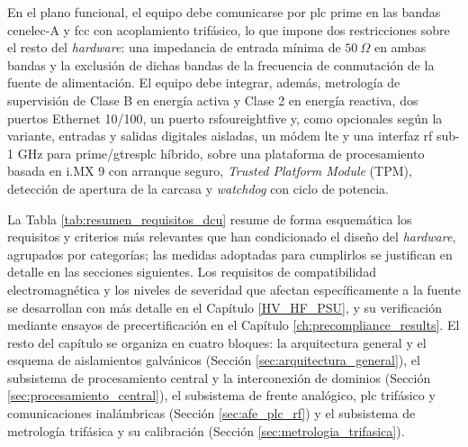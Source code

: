 En el plano funcional, el equipo debe comunicarse por \gls{plc} \gls{prime} en las bandas \gls{cenelec}-A y \gls{fcc} con acoplamiento trifásico, lo que impone dos restricciones sobre el resto del \textit{hardware}: una impedancia de entrada mínima de $50\ \Omega$ en ambas bandas y la exclusión de dichas bandas de la frecuencia de conmutación de la fuente de alimentación. El equipo debe integrar, además, metrología de supervisión de Clase B en energía activa y Clase 2 en energía reactiva, dos puertos Ethernet 10/100, un puerto \gls{rsfoureightfive} y, como opcionales según la variante, entradas y salidas digitales aisladas, un módem \gls{lte} y una interfaz \gls{rf} sub-1 GHz para \gls{prime}/\gls{gtresplc} híbrido, sobre una plataforma de procesamiento basada en i.MX 9 con arranque seguro, \textit{Trusted Platform Module} (TPM), detección de apertura de la carcasa y \textit{watchdog} con ciclo de potencia.

La Tabla \ref{tab:resumen_requisitos_dcu} resume de forma esquemática los requisitos y criterios más relevantes que han condicionado el diseño del \textit{hardware}, agrupados por categorías; las medidas adoptadas para cumplirlos se justifican en detalle en las secciones siguientes. Los requisitos de compatibilidad electromagnética y los niveles de severidad que afectan específicamente a la fuente se desarrollan con más detalle en el Capítulo \ref{HV_HF_PSU}, y su verificación mediante ensayos de precertificación en el Capítulo \ref{ch:precompliance_results}. El resto del capítulo se organiza en cuatro bloques: la arquitectura general y el esquema de aislamientos galvánicos (Sección \ref{sec:arquitectura_general}), el subsistema de procesamiento central y la interconexión de dominios (Sección \ref{sec:procesamiento_central}), el subsistema de frente analógico, \gls{plc} trifásico y comunicaciones inalámbricas (Sección \ref{sec:afe_plc_rf}) y el subsistema de metrología trifásica y su calibración (Sección \ref{sec:metrologia_trifasica}).

